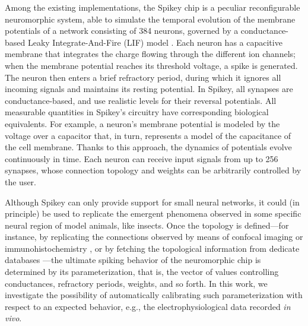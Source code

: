 \documentclass[utf8]{frontiersFPHY} %
\begin{document}
Among the existing implementations, the Spikey chip \cite{Pfeil2013} is a peculiar reconfigurable neuromorphic system, able to simulate the temporal evolution of the membrane potentials of a network consisting of 384 neurons, governed by a conductance-based Leaky Integrate-And-Fire (LIF) model  \cite{gerstner2002spiking}.
Each neuron has a capacitive membrane that integrates the charge flowing through the different ion channels; when the membrane potential reaches its threshold voltage, a spike is generated.  
The neuron then enters a brief refractory period, during which it ignores all incoming signals and maintains its resting potential.
In Spikey, all synapses are conductance-based, and use realistic levels for their reversal potentials. 
All measurable quantities in Spikey's circuitry have corresponding biological equivalents. 
For example, a neuron's membrane potential is modeled by the voltage over a capacitor that, in turn, represents a model of the capacitance of the cell membrane.
Thanks to this approach, the dynamics of potentials evolve continuously in time. 
Each neuron can receive input signals from up to 256 synapses, whose connection topology and weights can be arbitrarily controlled by the user.

Although Spikey can only provide support for small neural networks, it could (in principle) be used to replicate the emergent phenomena observed in some specific neural region of model animals, like insects. 
Once the topology is defined---for instance, by replicating the connections observed by means of confocal imaging \cite{mishima1999physiological} or immunohistochemistry \cite{nishikawa2008neural}, or by fetching the topological information from dedicate databases \cite{kazawa2008development}---the ultimate spiking behavior of the neuromorphic chip is determined by its parameterization, that is, the vector of values controlling conductances, refractory periods, weights, and so forth. 
In this work, we investigate the possibility of automatically calibrating such parameterization with respect to an expected behavior, e.g., the electrophysiological data recorded \emph{in vivo}.
\end{document}
